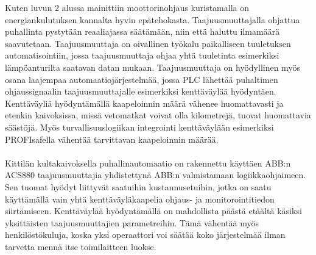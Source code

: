 \documentclass[finnish,12pt,a4paper,pdftex,elec,utf8]{aaltothesis}
\begin{document}
Kuten luvun 2 alussa mainittiin moottorinohjaus kuristamalla on energiankulutuksen kannalta hyvin epätehokasta. Taajuusmuuttajalla ohjattua puhallinta pystytään reaaliajassa säätämään, niin että haluttu ilmamäärä saavutetaan. Taajuusmuuttaja on oivallinen työkalu paikalliseen tuuletuksen automatisointiin, jossa taajuusmuuttaja ohjaa yhtä tuuletinta esimerkiksi lämpöanturilta saatavan datan mukaan. Taajuusmuuttaja on hyödyllinen myös osana laajempaa automaatiojärjestelmää, jossa PLC lähettää puhaltimen ohjaussignaalin taajuusmuuttajalle esimerkiksi kenttäväylää hyödyntäen. Kenttäväyliä hyödyntämällä kaapeloinnin määrä vähenee huomattavasti ja etenkin kaivoksissa, missä vetomatkat voivat olla kilometrejä, tuovat huomattavia säästöjä. Myös turvallisuuslogiikan integrointi kenttäväylään esimerkiksi PROFIsafella vähentää tarvittavan kaapeloinnin määrää.
\\\\
Kittilän kultakaivoksella puhallinautomaatio on rakennettu käyttäen ABB:n ACS880 taajuusmuuttajia yhdistettynä ABB:n valmistamaan logiikkaohjaimeen. Sen tuomat hyödyt liittyvät saatuihin kustannusetuihin, jotka on saatu käyttämällä vain yhtä kenttäväyläkaapelia ohjaus- ja monitorointitiedon siirtämiseen. Kenttäväylää hyödyntämällä on mahdollista päästä etäältä käsiksi yksittäisten taajuusmuuttajien parametreihin. Tämä vähentää myös henkilöstökuluja, koska yksi operaattori voi säätää koko järjestelmää ilman tarvetta mennä itse toimilaitteen luokse.

\end{document}
